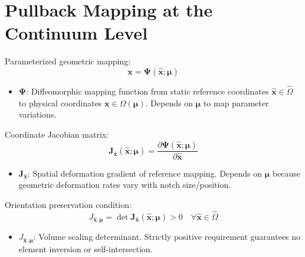 \documentclass[12pt,a4paper,oneside]{report}
\newcommand{\vect}[1]{\mathbf{#1}}
\begin{document}
\section{Pullback Mapping at the Continuum Level}

Parameterized geometric mapping:
\begin{equation}
    \vect{x} = \boldsymbol{\Psi}(\hat{\vect{x}}; \boldsymbol{\mu})
\end{equation}
\begin{tcolorbox}[colback=gray!5!white,colframe=gray!60!black,title={Term Definitions \& Parameter Dependencies}]
\begin{itemize}
    \item $\boldsymbol{\Psi}$: Diffeomorphic mapping function from static reference coordinates $\hat{\vect{x}} \in \hat{\Omega}$ to physical coordinates $\vect{x} \in \Omega(\boldsymbol{\mu})$. Depends on $\boldsymbol{\mu}$ to map parameter variations.
\end{itemize}
\end{tcolorbox}

Coordinate Jacobian matrix:
\begin{equation}
    \mathbf{J}_{\hat{\vect{x}}}(\hat{\vect{x}}; \boldsymbol{\mu}) = \frac{\partial \boldsymbol{\Psi}(\hat{\vect{x}}; \boldsymbol{\mu})}{\partial \hat{\vect{x}}}
\end{equation}
\begin{tcolorbox}[colback=gray!5!white,colframe=gray!60!black,title={Term Definitions \& Parameter Dependencies}]
\begin{itemize}
    \item $\mathbf{J}_{\hat{\vect{x}}}$: Spatial deformation gradient of reference mapping. Depends on $\boldsymbol{\mu}$ because geometric deformation rates vary with notch size/position.
\end{itemize}
\end{tcolorbox}

Orientation preservation condition:
\begin{equation}
    J_{\hat{\vect{x}}, \boldsymbol{\mu}} = \det \mathbf{J}_{\hat{\vect{x}}}(\hat{\vect{x}}; \boldsymbol{\mu}) > 0 \quad \forall \hat{\vect{x}} \in \hat{\Omega}
\end{equation}
\begin{tcolorbox}[colback=gray!5!white,colframe=gray!60!black,title={Term Definitions \& Parameter Dependencies}]
\begin{itemize}
    \item $J_{\hat{\vect{x}}, \boldsymbol{\mu}}$: Volume scaling determinant. Strictly positive requirement guarantees no element inversion or self-intersection.
\end{itemize}
\end{tcolorbox}
\end{document}
